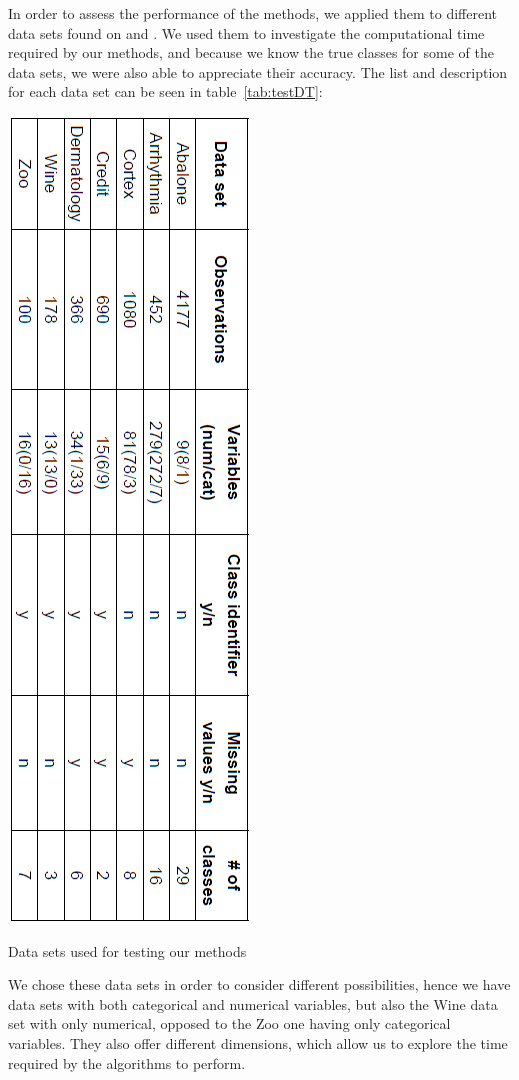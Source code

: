 \documentclass[twocolumn]{article}
\begin{document}
In order to assess the performance of the methods, we applied them to different data sets found on \cite{source1} and \cite{source2}.
We used them to investigate the computational time required by our methods, and because we know the true classes for some of the data sets, we were also able to appreciate their accuracy.
The list and description for each data set can be seen in table~\ref{tab:testDT}:
\begin{table}[!]
    \centering
    \includegraphics[scale=0.4]{img/dataSets.png}
    \caption{Data sets used for testing our methods}
    \label{tab:testDT}
\end{table}
We chose these data sets in order to consider different possibilities, hence we have data sets with both categorical and numerical variables, but also the Wine data set with only numerical, opposed to the Zoo one having only categorical variables.
They also offer different dimensions, which allow us to explore the time required by the algorithms to perform.
\end{document}
